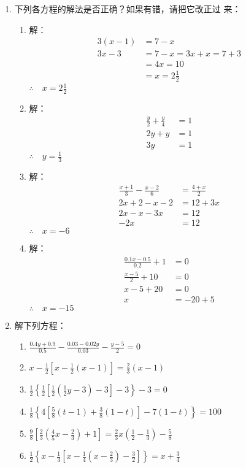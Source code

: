 \begin{enumerate}
\item 下列各方程的解法是否正确？如果有错，请把它改正过
来：
\begin{enumerate}
    \item 解： 
    \[\begin{split}
        3(x-1)&=7-x\\
        3x-3&=7-x=3x+x=7+3\\
        &=4x=10\\
        &=x=2\frac{1}{2}
    \end{split}\]
    $\therefore\quad x=2\frac{1}{2}$
    \item 解： 
    \[\begin{split}
        \frac{y}{2}+\frac{y}{4}&=1\\
        2y+y&=1\\
        3y&=1
    \end{split}\]
    $\therefore\quad y=\frac{1}{3}$
    \item 解： 
    \[\begin{split}
        \frac{x+1}{3}-\frac{x-2}{6}&=\frac{4+x}{2}\\
        2x+2-x-2&=12+3x\\
        2x-x-3x&=12\\
        -2x&=12
    \end{split}\]
    $\therefore\quad x=-6$
    \item 解：
    \[\begin{split}
        \frac{0.1x-0.5}{0.2}+1&=0\\
        \frac{x-5}{2}+10&=0\\
        x-5+20&=0\\
        x&=-20+5
    \end{split}\]
    $\therefore\quad x=-15$
\end{enumerate}

\item 解下列方程：
\begin{enumerate}
\item $\frac{0.4 y+0.9}{0.5}-\frac{0.03-0.02 y}{0.03}-\frac{y-5}{2}=0$
\item $x-\frac{1}{2}\left[x-\frac{1}{2}(x-1)\right]=\frac{2}{3}(x-1)$
\item $\frac{1}{2}\left\{\frac{1}{2}\left[\frac{1}{2}\left(\frac{1}{2} y-3\right)-3\right]-3\right\}-3=0$
\item $\frac{1}{8}\left\{4\left[\frac{5}{8}(t-1)+\frac{3}{8}(1-t)\right]-7(1-t)\right\}=100$
\item $\frac{9}{8}\left[\frac{2}{3}\left(\frac{4}{5} x-\frac{2}{3}\right)+1\right]=\frac{2}{3} x\left(\frac{1}{2}-\frac{1}{3}\right)-\frac{5}{8}$
\item $\frac{1}{2}\left\{x-\frac{1}{3}\left[x-\frac{1}{4}\left(x-\frac{2}{3}\right)-\frac{3}{2}\right]\right\}=x+\frac{3}{4}$
\end{enumerate}


\end{enumerate}
